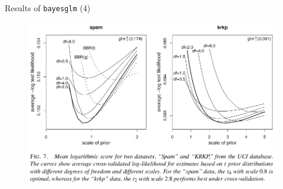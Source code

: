 \documentclass{beamer}
\begin{document}
\begin{frame}{Results of \texttt{bayesglm} (4)}
	\begin{figure}
		\includegraphics[scale=0.24]{imgs/result4a.png}
	\end{figure}
\end{frame}

	
\end{document}
